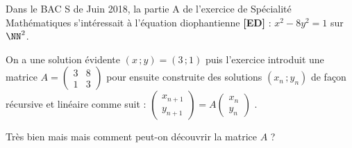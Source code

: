 Dans le BAC S de Juin 2018, la partie A de l'exercice de Spécialité Mathématiques s'intéressait à l'équation diophantienne \textbf{[ED]} : $x^2 - 8 y^2 = 1$ sur $\NN^2$.


\medskip

On a une solution évidente $(x \,; y) = (3 \,; 1)$ puis l'exercice introduit une matrice 
$A =
\begin{pmatrix} 
  3 & 8  \\ 
  1 & 3 
\end{pmatrix}$
pour ensuite construite des solutions $(x_n \,; y_n)$ de façon récursive et linéaire comme suit :
$\begin{pmatrix} 
  x_{n+1} \\ 
  y_{n+1} 
\end{pmatrix}
=
A
\begin{pmatrix} 
  x_{n} \\ 
  y_{n} 
\end{pmatrix}
$ .


\medskip

Très bien mais mais comment peut-on découvrir la matrice  $A$ ?